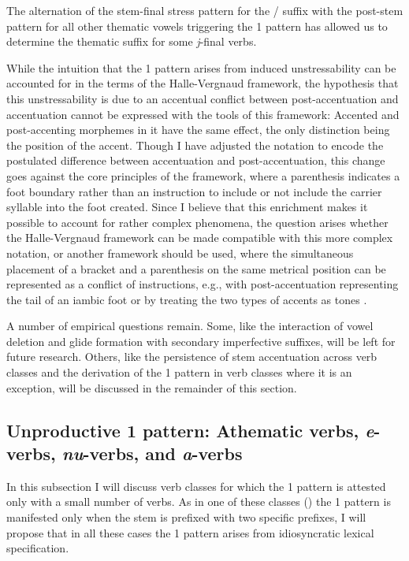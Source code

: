 \documentclass[output=paper,colorlinks,citecolor=black,koreanfont]{langscibook}
\begin{document}
The alternation of the stem-final stress pattern for the / suffix with the post-stem pattern for all other thematic vowels triggering the {1\SG} pattern has allowed us to determine the thematic suffix for some \textit{j}-final verbs.

While the intuition that the {1\SG} pattern arises from induced unstressability can be accounted for in the terms of the Halle-Vergnaud framework, the hypothesis that this unstressability is due to an accentual conflict between post-accentuation and accentuation cannot be expressed with the tools of this framework: Accented and post-accenting morphemes in it have the same effect, the only distinction being the position of the accent. Though I have adjusted the notation to encode the postulated difference between accentuation and post-accentuation, this change goes against the core principles of the framework, where a parenthesis indicates a foot boundary rather than an instruction to include or not include the carrier syllable into the foot created. Since I believe that this enrichment makes it possible to account for rather complex phenomena, the question arises whether the Halle-Vergnaud framework can be made compatible with this more complex notation, or another framework should be used, where the simultaneous placement of a bracket 
and a parenthesis on the same metrical position can be represented as a conflict of instructions, e.g., with post-accentuation representing the tail of an iambic foot or by treating the two types of accents as tones \citep{Matushansky2023b}. 

A number of empirical questions remain. Some, like the interaction of vowel deletion and glide formation with secondary imperfective suffixes, will be left for future research. Others, like the persistence of stem accentuation across verb classes and the derivation of the {1\SG} pattern in verb classes where it is an exception, will be discussed in the remainder of this section.

\subsection{Unproductive {1\SG} pattern: Athematic verbs, \textit{e}-verbs, \textit{nu}-verbs, and \textit{a}-verbs}

In this subsection I will discuss verb classes for which the {1\SG} pattern is attested only with a small number of verbs. As in one of these classes () the {1\SG} pattern is manifested only when the stem is prefixed with two specific prefixes, I will propose that in all these cases the {1\SG} pattern arises from idiosyncratic lexical specification.
\end{document}
